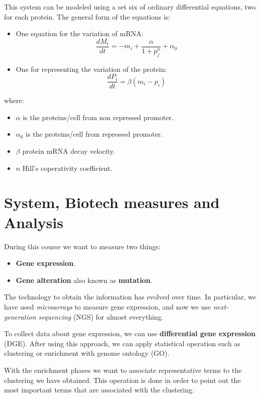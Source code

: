 This system can be modeled using a set six of ordinary differential equations,
two for each protein. The general form of the equations is:
\begin{itemize}
    \item One equation for the variation of mRNA:
          \begin{equation}
              \frac{dM_i}{dt} = -m_i + \frac{\alpha}{1 + p_j^n} + \alpha_0
          \end{equation}
    \item One for representing the variation of the protein:
          \begin{equation}
              \frac{dP_i}{dt} = \beta (m_i - p_i)
          \end{equation}
\end{itemize}
where:
\begin{itemize}
    \item $\alpha$ is the proteins/cell from non repressed promoter.
    \item $\alpha_0$ is the proteins/cell from repressed promoter.
    \item $\beta$ protein mRNA decay velocity.
    \item $n$ Hill's coperativity coefficient.
\end{itemize}
\section{System, Biotech measures and Analysis}
During this course we want to measure two things:
\begin{itemize}
    \item \textbf{Gene expression}.
    \item \textbf{Gene alteration} also known as \textbf{mutation}.
\end{itemize}

The technology to obtain the information has evolved over time. In particular,
we have used \textit{microarrays} to measure gene expression, and now we use
\textit{next-generation sequencing} (NGS) for almost everything.

To collect data about gene expression, we can use \textbf{differential gene
    expression} (DGE). After using this approach, we can apply statistical
operation such as clustering or enrichment with genome ontology (GO).

With the enrichment phases we want to associate representative terms to the
clustering we have obtained. This operation is done in order to point out the
most important terms that are associated with the clustering.

